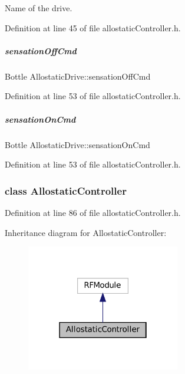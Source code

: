 Name of the drive. 



Definition at line 45 of file allostatic\+Controller.\+h.

\mbox{\label{group__allostaticController_a10d504bd4b07b96cac8bbb040bb5fd57}} 
\subparagraph{\texorpdfstring{sensation\+Off\+Cmd}{sensationOffCmd}}
{\footnotesize\ttfamily Bottle Allostatic\+Drive\+::sensation\+Off\+Cmd}



Definition at line 53 of file allostatic\+Controller.\+h.

\mbox{\label{group__allostaticController_a26f0b7c82d8ad12eaf4e3a68f4000302}} 
\subparagraph{\texorpdfstring{sensation\+On\+Cmd}{sensationOnCmd}}
{\footnotesize\ttfamily Bottle Allostatic\+Drive\+::sensation\+On\+Cmd}



Definition at line 53 of file allostatic\+Controller.\+h.

\label{classAllostaticController}
\subsubsection{class Allostatic\+Controller}


Definition at line 86 of file allostatic\+Controller.\+h.



Inheritance diagram for Allostatic\+Controller\+:
\nopagebreak
\begin{figure}[H]
\begin{center}
\leavevmode
\includegraphics[width=190pt]{classAllostaticController__inherit__graph}
\end{center}
\end{figure}
